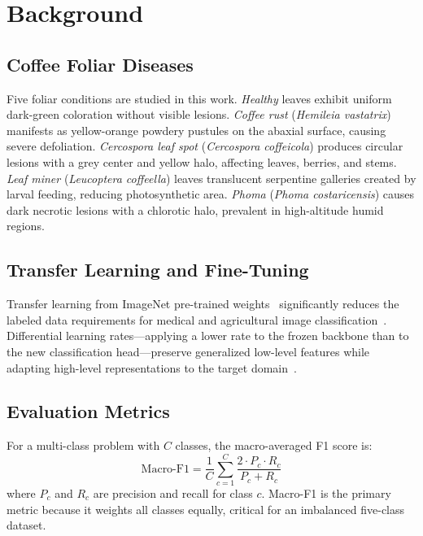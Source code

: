 \documentclass[conference]{IEEEtran}
\begin{document}
\section{Background}

\subsection{Coffee Foliar Diseases}

Five foliar conditions are studied in this work. \textit{Healthy} leaves
exhibit uniform dark-green coloration without visible lesions. \textit{Coffee
rust} (\textit{Hemileia vastatrix}) manifests as yellow-orange powdery
pustules on the abaxial surface, causing severe defoliation. \textit{Cercospora
leaf spot} (\textit{Cercospora coffeicola}) produces circular lesions with a
grey center and yellow halo, affecting leaves, berries, and stems.
\textit{Leaf miner} (\textit{Leucoptera coffeella}) leaves translucent
serpentine galleries created by larval feeding, reducing photosynthetic
area. \textit{Phoma} (\textit{Phoma costaricensis}) causes dark necrotic
lesions with a chlorotic halo, prevalent in high-altitude humid regions.

\subsection{Transfer Learning and Fine-Tuning}

Transfer learning from ImageNet pre-trained weights~\cite{imagenet}
significantly reduces the labeled data requirements for medical and
agricultural image classification~\cite{mohanty2016}. Differential learning
rates—applying a lower rate to the frozen backbone than to the new
classification head—preserve generalized low-level features while adapting
high-level representations to the target domain~\cite{howard2018}.

\subsection{Evaluation Metrics}

For a multi-class problem with $C$ classes, the macro-averaged F1 score is:
\begin{equation}
  \text{Macro-F1} = \frac{1}{C}\sum_{c=1}^{C}
    \frac{2 \cdot P_c \cdot R_c}{P_c + R_c}
  \label{eq:macrof1}
\end{equation}
where $P_c$ and $R_c$ are precision and recall for class $c$.
Macro-F1 is the primary metric because it weights all classes equally,
critical for an imbalanced five-class dataset.
\end{document}
